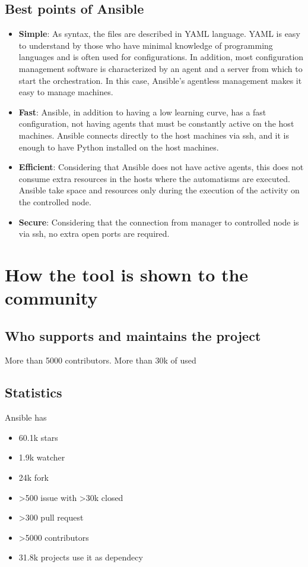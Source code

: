 \documentclass[12pt,a4paper,openright,twoside]{book}
\begin{document}
\subsection{Best points of Ansible}
\begin{itemize}
    \item \textbf{Simple}: As syntax, the files are described in YAML language. YAML is easy to understand by those who have minimal knowledge of programming languages and is often used for configurations. In addition, most configuration management software is characterized by an agent and a server from which to start the orchestration. In this case, Ansible's agentless management makes it easy to manage machines.
    \item \textbf{Fast}: Ansible, in addition to having a low learning curve, has a fast configuration, not having agents that must be constantly active on the host machines. Ansible connects directly to the host machines via ssh, and it is enough to have Python installed on the host machines.
    \item \textbf{Efficient}: Considering that Ansible does not have active agents, this does not consume extra resources in the hosts where the automatisms are executed. Ansible take space and resources only during the execution of the activity on the controlled node.
    \item \textbf{Secure}: Considering that the connection from manager to controlled node is via ssh, no extra open ports are required.
\end{itemize}

\section{How the tool is shown to the community}

\subsection{Who supports and maintains the project}
More than 5000 contributors.
More than 30k of used 
\subsection{Statistics}

Ansible has 
\begin{itemize}
    \item 60.1k stars
    \item 1.9k watcher
    \item 24k fork
    \item >500 issue with >30k closed
    \item >300 pull request
    \item >5000 contributors
    \item 31.8k projects use it as dependecy
\end{itemize}
\end{document}
